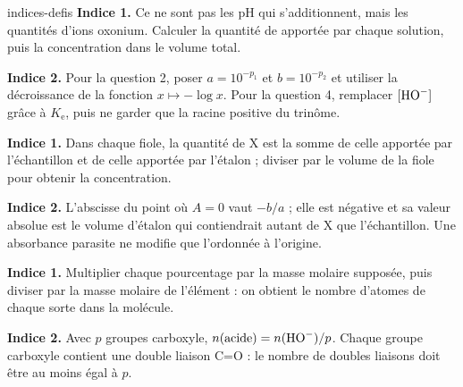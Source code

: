 \begin{blocEdition}{indices-defis}
\textbf{Indice 1.} Ce ne sont pas les pH qui s'additionnent, mais les quantités d'ions oxonium.
Calculer la quantité de  apportée par chaque solution, puis la concentration dans le volume total.\par\smallskip
\textbf{Indice 2.} Pour la question 2, poser $a=10^{-p_1}$ et $b=10^{-p_2}$ et utiliser la décroissance
de la fonction $x\mapsto-\log x$. Pour la question 4, remplacer $[\ce{HO-}]$ grâce à $K_\mathrm{e}$,
puis ne garder que la racine positive du trinôme.\par\smallskip
{}
\textbf{Indice 1.} Dans chaque fiole, la quantité de X est la somme de celle apportée par l'échantillon et de celle
apportée par l'étalon ; diviser par le volume de la fiole pour obtenir la concentration.\par\smallskip
\textbf{Indice 2.} L'abscisse du point où $A=0$ vaut $-b/a$ ; elle est négative et sa valeur absolue est le volume
d'étalon qui contiendrait autant de X que l'échantillon. Une absorbance parasite ne modifie que l'ordonnée à l'origine.\par\smallskip
{}
\textbf{Indice 1.} Multiplier chaque pourcentage par la masse molaire supposée, puis diviser par la masse molaire
de l'élément : on obtient le nombre d'atomes de chaque sorte dans la molécule.\par\smallskip
\textbf{Indice 2.} Avec $p$ groupes carboxyle, $n(\text{acide})=n(\ce{HO-})/p$. Chaque groupe carboxyle contient une
double liaison C=O : le nombre de doubles liaisons doit être au moins égal à $p$.\par\smallskip
\end{blocEdition}

